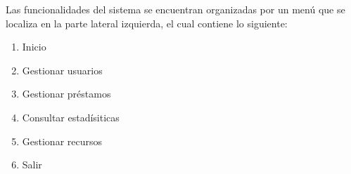 Las funcionalidades del sistema se encuentran organizadas por
un menú que se localiza en la parte lateral izquierda, el 
cual contiene lo siguiente:

\begin{enumerate}
	\item Inicio
	\item Gestionar usuarios
	\item Gestionar préstamos
	\item Consultar estadísiticas
	\item Gestionar recursos
	\item Salir
\end{enumerate} 


